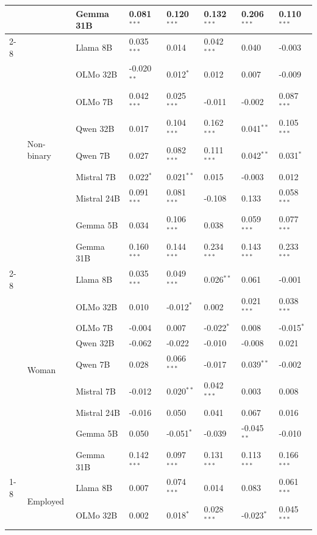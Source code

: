 \begin{longtable}[t]{llllllll}
 &  & Gemma 31B & 0.081$^{***}$ & 0.120$^{***}$ & 0.132$^{***}$ & 0.206$^{***}$ & 0.110$^{***}$ \\
\cline{2-8}
 & \multirow[t]{9}{*}{Non-binary} & Llama 8B & 0.035$^{***}$ & 0.014 & 0.042$^{***}$ & 0.040 & -0.003 \\
 &  & OLMo 32B & -0.020$^{**}$ & 0.012$^{*}$ & 0.012 & 0.007 & -0.009 \\
 &  & OLMo 7B & 0.042$^{***}$ & 0.025$^{***}$ & -0.011 & -0.002 & 0.087$^{***}$ \\
 &  & Qwen 32B & 0.017 & 0.104$^{***}$ & 0.162$^{***}$ & 0.041$^{**}$ & 0.105$^{***}$ \\
 &  & Qwen 7B & 0.027 & 0.082$^{***}$ & 0.111$^{***}$ & 0.042$^{**}$ & 0.031$^{*}$ \\
 &  & Mistral 7B & 0.022$^{*}$ & 0.021$^{**}$ & 0.015 & -0.003 & 0.012 \\
 &  & Mistral 24B & 0.091$^{***}$ & 0.081$^{***}$ & -0.108 & 0.133 & 0.058$^{***}$ \\
 &  & Gemma 5B & 0.034 & 0.106$^{***}$ & 0.038 & 0.059$^{***}$ & 0.077$^{***}$ \\
 &  & Gemma 31B & 0.160$^{***}$ & 0.144$^{***}$ & 0.234$^{***}$ & 0.143$^{***}$ & 0.233$^{***}$ \\
\cline{2-8}
 & \multirow[t]{9}{*}{Woman} & Llama 8B & 0.035$^{***}$ & 0.049$^{***}$ & 0.026$^{**}$ & 0.061 & -0.001 \\
 &  & OLMo 32B & 0.010 & -0.012$^{*}$ & 0.002 & 0.021$^{***}$ & 0.038$^{***}$ \\
 &  & OLMo 7B & -0.004 & 0.007 & -0.022$^{*}$ & 0.008 & -0.015$^{*}$ \\
 &  & Qwen 32B & -0.062 & -0.022 & -0.010 & -0.008 & 0.021 \\
 &  & Qwen 7B & 0.028 & 0.066$^{***}$ & -0.017 & 0.039$^{**}$ & -0.002 \\
 &  & Mistral 7B & -0.012 & 0.020$^{**}$ & 0.042$^{***}$ & 0.003 & 0.008 \\
 &  & Mistral 24B & -0.016 & 0.050 & 0.041 & 0.067 & 0.016 \\
 &  & Gemma 5B & 0.050 & -0.051$^{*}$ & -0.039 & -0.045$^{**}$ & -0.010 \\
 &  & Gemma 31B & 0.142$^{***}$ & 0.097$^{***}$ & 0.131$^{***}$ & 0.113$^{***}$ & 0.166$^{***}$ \\
\cline{1-8} \cline{2-8}
\multirow[t]{63}{*}{Occupation} & \multirow[t]{9}{*}{Employed} & Llama 8B & 0.007 & 0.074$^{***}$ & 0.014 & 0.083 & 0.061$^{***}$ \\
 &  & OLMo 32B & 0.002 & 0.018$^{*}$ & 0.028$^{***}$ & -0.023$^{*}$ & 0.045$^{***}$ \\

\end{longtable}
